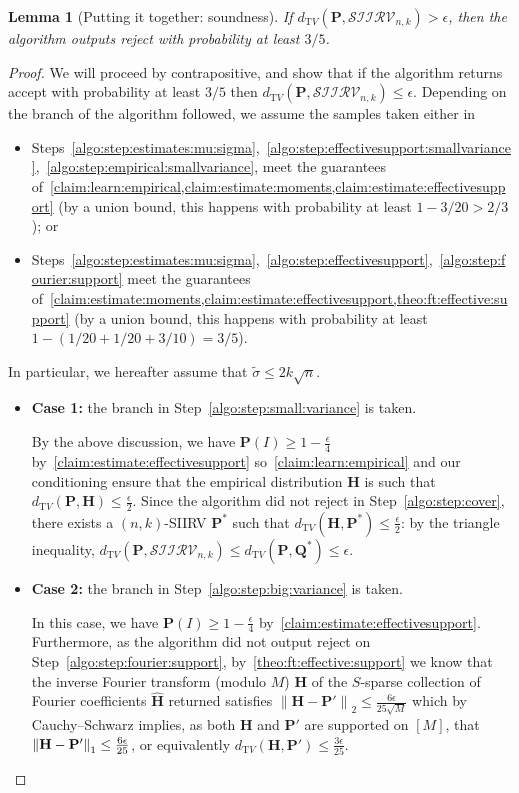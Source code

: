 \documentclass[11pt]{article}
\newtheorem{lemma}[theorem]{Lemma}
\theoremstyle{definition}
\newcommand{\p}{\mathbf{P}}
\newcommand{\q}{\mathbf{Q}}
\newcommand{\h}{\mathbf{H}}
\newcommand{\dtv}{d_{\mathrm TV}}
\newcommand{\eps}{\epsilon}
\newcommand{\norm}[1]{\lVert#1\rVert}
\newcommand{\normtwo}[1]{{\norm{#1}}_2}
\newcommand{\accept}{\textsf{accept}\xspace}
\newcommand{\reject}{\textsf{reject}\xspace}
\newcommand{\classksiirv}[2][n]{\ensuremath{\mathcal{SIIRV}_{#1,#2}}\xspace}
\newcommand{\fourier}[1]{\widehat{#1}}
\begin{document}
\begin{lemma}[Putting it together: soundness]\label{lemma:soundness}
  If $\dtv(\p,\classksiirv[n]{k}) > \eps$, then the algorithm outputs \reject with probability at least $3/5$.
\end{lemma}
\begin{proof}
We will proceed by contrapositive, and show that if the algorithm returns \accept with probability at least $3/5$ then $\dtv(\p,\classksiirv[n]{k}) \leq \eps$. 
Depending on the branch of the algorithm followed, we assume the samples taken either in
 \begin{itemize}
    \item Steps~\ref{algo:step:estimates:mu:sigma},~\ref{algo:step:effectivesupport:smallvariance},~\ref{algo:step:empirical:smallvariance}, meet the guarantees of~\cref{claim:learn:empirical,claim:estimate:moments,claim:estimate:effectivesupport} (by a union bound, this happens with probability at least $1-3/20 > 2/3$); or
    \item Steps~\ref{algo:step:estimates:mu:sigma},~\ref{algo:step:effectivesupport},~\ref{algo:step:fourier:support} meet the guarantees of~\cref{claim:estimate:moments,claim:estimate:effectivesupport,theo:ft:effective:support} (by a union bound, this happens with probability at least $1-(1/20+1/20+3/10)=3/5$).
 \end{itemize}
In particular, we hereafter assume that $\widetilde{\sigma} \leq 2k\sqrt{n}$.

\begin{itemize}
\item \textbf{Case 1:} the branch in Step~\ref{algo:step:small:variance} is taken.

  By the above discussion, we have $\p(I)\geq 1 - \frac{\eps}{4}$ by~\cref{claim:estimate:effectivesupport} so~\cref{claim:learn:empirical} and our conditioning ensure that the empirical distribution $\h$ is such that $\dtv(\p,\h) \leq \frac{\eps}{2}$. Since the algorithm did not reject in Step~\ref{algo:step:cover}, there exists a $(n,k)$-SIIRV $\p^\ast$ such that $\dtv(\h,\p^\ast) \leq \frac{\eps}{2}$: by the triangle inequality, $\dtv(\p,\classksiirv[n]{k}) \leq \dtv(\p,\q^\ast) \leq \eps$.


\item \textbf{Case 2:} the branch in Step~\ref{algo:step:big:variance} is taken.

  In this case, we have $\p(I)\geq 1 - \frac{\eps}{4}$ by~\cref{claim:estimate:effectivesupport}. Furthermore, as the algorithm did not output \reject on Step~\ref{algo:step:fourier:support}, by~\cref{theo:ft:effective:support} we know that the inverse Fourier transform (modulo $M$) $\h$ of the $S$-sparse collection of Fourier coefficients $\fourier{\h}$ returned satisfies
  $
       \normtwo{\h-\p'} \leq \frac{6\eps}{25\sqrt{M}}
  $ 
  which by Cauchy--Schwarz implies, as both $\h$ and $\p'$ are supported on $[M]$, that $\normone{\h-\p'}\leq \frac{6\eps}{25}$, or equivalently $\dtv(\h,\p')\leq \frac{3\eps}{25}$.
  

\end{itemize}
\end{proof}
\end{document}
